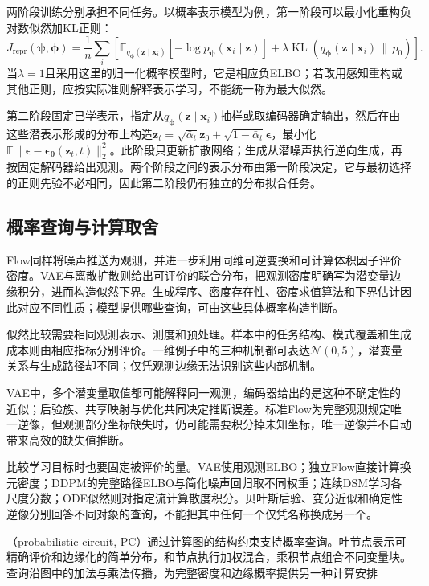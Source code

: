 两阶段训练分别承担不同任务。以概率表示模型为例，第一阶段可以最小化重构负对数似然加KL正则：
\[
  J_{\mathrm{repr}}(\bm\psi,\bm\phi)
  =\frac1n\sum_i\left[
      \mathbb E_{q_{\bm\phi}(\bm z\mid\bm x_i)}
        [-\log p_{\bm\psi}(\bm x_i\mid\bm z)]
       +\lambda\operatorname{KL}(q_{\bm\phi}(\bm z\mid\bm x_i)\,\|\,p_0)
                 \right].
\]
当$\lambda=1$且采用这里的归一化概率模型时，它是相应负ELBO；若改用感知重构或其他正则，应按实际准则解释表示学习，不能统一称为最大似然。

第二阶段固定已学表示，指定从$q_{\bm\phi}(\bm z\mid\bm x_i)$抽样或取编码器确定输出，然后在由这些潜表示形成的分布上构造$\bm z_t=\sqrt{\bar\alpha_t}\bm z_0+\sqrt{1-\bar\alpha_t}\bm\epsilon$，最小化$\mathbb E\|\bm\epsilon-\bm\epsilon_{\bm\theta}(\bm z_t,t)\|_2^2$。此阶段只更新扩散网络；生成从潜噪声执行逆向生成，再按固定解码器给出观测。两个阶段之间的表示分布由第一阶段决定，它与最初选择的正则先验不必相同，因此第二阶段仍有独立的分布拟合任务。

\subsection{概率查询与计算取舍}

\label{sec:pgm-generative-likelihood-posterior-sampling}

Flow同样将噪声推送为观测，并进一步利用同维可逆变换和可计算体积因子评价密度。VAE与离散扩散则给出可评价的联合分布，把观测密度明确写为潜变量边缘积分，进而构造似然下界。生成程序、密度存在性、密度求值算法和下界估计因此对应不同性质；模型提供哪些查询，可由这些具体概率构造判断。

似然比较需要相同观测表示、测度和预处理。样本中的任务结构、模式覆盖和生成成本则由相应指标分别评价。一维例子中的三种机制都可表达$\mathcal{N}(0,5)$，潜变量关系与生成路径却不同；仅凭观测边缘无法识别这些内部机制。

\label{sec:pgm-generative-hybrids}

VAE中，多个潜变量取值都可能解释同一观测，编码器给出的是这种不确定性的近似；后验族、共享映射与优化共同决定推断误差。标准Flow为完整观测规定唯一逆像，但观测部分坐标缺失时，仍可能需要积分掉未知坐标，唯一逆像并不自动带来高效的缺失值推断。

比较学习目标时也要固定被评价的量。VAE使用观测ELBO；独立Flow直接计算换元密度；DDPM的完整路径ELBO与简化噪声回归取不同权重；连续DSM学习各尺度分数；ODE似然则对指定流计算散度积分。贝叶斯后验、变分近似和确定性逆像分别回答不同对象的查询，不能把其中任何一个仅凭名称换成另一个。

（probabilistic circuit, PC）通过计算图的结构约束支持概率查询。叶节点表示可精确评价和边缘化的简单分布，和节点执行加权混合，乘积节点组合不同变量块。查询沿图中的加法与乘法传播，为完整密度和边缘概率提供另一种计算安排

